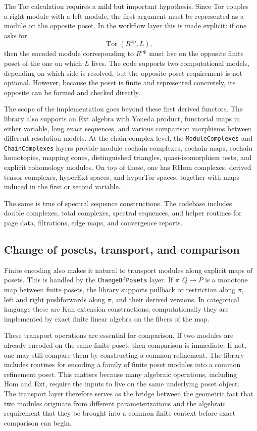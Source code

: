 \documentclass[11pt]{article}
\theoremstyle{definition}
\theoremstyle{remark}
\begin{document}
The Tor calculation requires a mild but important hypothesis.  Since Tor couples a right module with a left module, the first argument must be represented as a module on the opposite poset.  In the workflow layer this is made explicit: if one asks for
\[
\operatorname{Tor}(R^{\mathrm{op}},L),
\]
then the encoded module corresponding to $R^{\mathrm{op}}$ must live on the opposite finite poset of the one on which $L$ lives.  The code supports two computational models, depending on which side is resolved, but the opposite poset requirement is not optional. However, because the poset is finite and represented concretely, its opposite can be formed and checked directly.

The scope of the implementation goes beyond these first derived functors.  The library also supports an Ext algebra with Yoneda product, functorial maps in either variable, long exact sequences, and various comparison morphisms between different resolution models. At the chain-complex level, the \texttt{ModuleComplexes} and \texttt{ChainComplexes} layers provide module cochain complexes, cochain maps, cochain homotopies, mapping cones, distinguished triangles, quasi-isomorphism tests, and explicit cohomology modules.  On top of those, one has RHom complexes, derived tensor complexes, hyperExt spaces, and hyperTor spaces, together with maps induced in the first or second variable.

The same is true of spectral sequence constructions.  The codebase includes double complexes, total complexes, spectral sequences, and helper routines for page data, filtrations, edge maps, and convergence reports.


\subsection{Change of posets, transport, and comparison}

Finite encoding also makes it natural to transport modules along explicit maps of posets.  This is handled by the \texttt{ChangeOfPosets} layer.  If $\pi : Q\to P$ is a monotone map between finite posets, the library supports pullback or restriction along $\pi$, left and right pushforwards along $\pi$, and their derived versions.  In categorical language these are Kan extension constructions; computationally they are implemented by exact finite linear algebra on the fibers of the map.

These transport operations are essential for comparison.  If two modules are already encoded on the same finite poset, then comparison is immediate.  If not, one may still compare them by constructing a common refinement.  The library includes routines for encoding a family of finite poset modules into a common refinement poset.  This matters because many algebraic operations, including Hom and Ext, require the inputs to live on the same underlying poset object.  The transport layer therefore serves as the bridge between the geometric fact that two modules originate from different parameterizations and the algebraic requirement that they be brought into a common finite context before exact comparison can begin.
\end{document}
